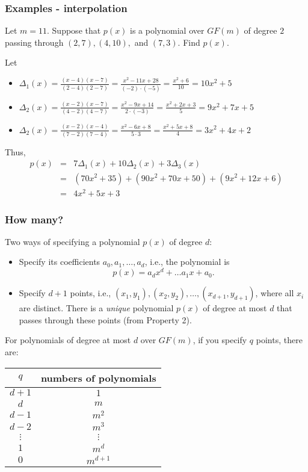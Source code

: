 \begin{frame}
  \frametitle{Examples - interpolation}

  Let $m=11$. Suppose that $p(x)$ is a polynomial over $GF(m)$ of
  degree $2$ passing through $(2,7),(4,10),$ and $(7,3)$.  Find $p(x)$.

  \pause
  Let
  \begin{itemize}
  \item \pause
    $\Delta_1(x)=\frac{(x-4)(x-7)}{(2-4)(2-7)}
    =\frac{x^2-11x+28}{(-2)\cdot(-5)}
    =\frac{x^2+6}{10}
    =10x^2+5$
  \item \pause
    $\Delta_2(x)=\frac{(x-2)(x-7)}{(4-2)(4-7)}
    =\frac{x^2-9x+14}{2\cdot(-3)}
    =\frac{x^2+2x+3}{5}
    =9x^2+7x+5$
  \item \pause
    $\Delta_2(x)=\frac{(x-2)(x-4)}{(7-2)(7-4)}
    =\frac{x^2-6x+8}{5\cdot 3}
    =\frac{x^2+5x+8}{4}
    =3x^2+4x+2$
  \end{itemize}

  Thus,
  \begin{eqnarray*}
    p(x) &=&  7\Delta_1(x) + 10\Delta_2(x) + 3\Delta_3(x) \\
    &=& (70x^2 + 35) + (90x^2 + 70x+50) + (9x^2+12x+6) \\
    &=& 4x^2+5x+3
  \end{eqnarray*}
\end{frame}

\begin{frame}
  \frametitle{How many?}
\end{frame}

\begin{frame}
  Two ways of specifying a polynomial $p(x)$ of degree $d$:
  \begin{itemize}
  \item Specify its coefficients $a_0,a_1,\ldots,a_d$, i.e., the
    polynomial is
    \[
    p(x) = a_d x^d + \ldots a_1 x + a_0.
    \]
    \pause
  \item Specify $d+1$ points, i.e.,
    $(x_1,y_1),(x_2,y_2),\ldots,(x_{d+1},y_{d+1})$, where all $x_i$
    are distinct.  There is a {\em unique} polynomial $p(x)$ of degree
    at most $d$ that passes through these points (from Property 2).
  \end{itemize}
\end{frame}

\begin{frame}
  For polynomials of degree at most $d$ over $GF(m)$, if you specify
  $q$ points, there are:
  
  \begin{tabular}{c|c}
    $q$ & numbers of polynomials \\
    \hline
    $d+1$ & $1$ \\
    $d$ & $m$ \\
    $d-1$ & $m^2$ \\
    $d-2$ & $m^3$ \\
    $\vdots$ & $\vdots$ \\
    $1$ & $m^d$ \\
    $0$ & $m^{d+1}$
  \end{tabular}
\end{frame}

